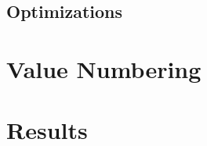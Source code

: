 \documentclass{beamer}
\begin{document}
\subsection{Optimizations}

\section{Value Numbering}

\section{Results}
\end{document}
